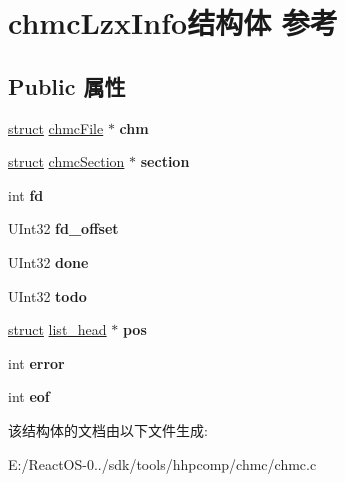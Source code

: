 \hypertarget{structchmc_lzx_info}{}\section{chmc\+Lzx\+Info结构体 参考}
\label{structchmc_lzx_info}
\subsection*{Public 属性}
\begin{DoxyCompactItemize}
\item 
\mbox{\label{structchmc_lzx_info_a84b32fdbf9f650363dee8a6766c52c8f}} 
\hyperlink{interfacestruct}{struct} \hyperlink{structchmc_file}{chmc\+File} $\ast$ {\bfseries chm}
\item 
\mbox{\label{structchmc_lzx_info_a3d9bb653a72db5fb0edba2cd07aa40ea}} 
\hyperlink{interfacestruct}{struct} \hyperlink{structchmc_section}{chmc\+Section} $\ast$ {\bfseries section}
\item 
\mbox{\label{structchmc_lzx_info_a95d79e97b561339e7c51faea9f24a8d2}} 
int {\bfseries fd}
\item 
\mbox{\label{structchmc_lzx_info_a48e17049677cd54f4c402092281d44cc}} 
U\+Int32 {\bfseries fd\+\_\+offset}
\item 
\mbox{\label{structchmc_lzx_info_a1accc8ce105e7e9621f4fa7949a20ad7}} 
U\+Int32 {\bfseries done}
\item 
\mbox{\label{structchmc_lzx_info_ab68c1ec95fbf279cd5b54e8788532d7e}} 
U\+Int32 {\bfseries todo}
\item 
\mbox{\label{structchmc_lzx_info_ac6013eb236a2030c1175f48fe1f0a935}} 
\hyperlink{interfacestruct}{struct} \hyperlink{structlist__head}{list\+\_\+head} $\ast$ {\bfseries pos}
\item 
\mbox{\label{structchmc_lzx_info_a7dff4af2c518056c7115370d8681d0ff}} 
int {\bfseries error}
\item 
\mbox{\label{structchmc_lzx_info_a6d3f69b882958130431928eabcca92c7}} 
int {\bfseries eof}
\end{DoxyCompactItemize}


该结构体的文档由以下文件生成\+:\begin{DoxyCompactItemize}
\item 
E\+:/\+React\+O\+S-\/0../sdk/tools/hhpcomp/chmc/chmc.\+c\end{DoxyCompactItemize}
